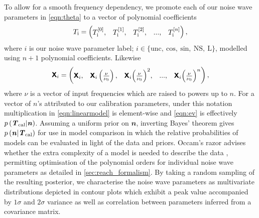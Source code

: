 To allow for a smooth frequency dependency, we promote each of our noise wave parameters in \cref{eqn:theta} to a vector of polynomial coefficients
\begin{equation}
    T_{\mathrm{i}} = \begin{pmatrix}
    T_{\mathrm{i}}^{[0]}, & T_{\mathrm{i}}^{[1]}, & T_{\mathrm{i}}^{[2]}, & ..., & T_{\mathrm{i}}^{[n]}
    \end{pmatrix},
\end{equation}
where $i$ is our noise wave parameter label; $i \in \{\mathrm{unc, \ cos, \ sin , \ NS, \ L}\}$, modelled using $n+1$ polynomial coefficients. Likewise
\begin{equation}
    \textbf{\textsf{X}}_{i} = \begin{pmatrix}
    \textbf{\textsf{X}}_{i}, & \textbf{\textsf{X}}_{i}\left(\frac{\nu}{\nu_0}\right), & \textbf{\textsf{X}}_{i}{\left(\frac{\nu}{\nu_0}\right)}^2, & ..., &  \textbf{\textsf{X}}_{i}{\left(\frac{\nu}{\nu_0}\right)}^{n}
    \end{pmatrix},
\end{equation}
where $\nu$ is a vector of input frequencies which are raised to powers up to $n$. For a vector of $n$'s attributed to our calibration parameters, under this notation multiplication in \cref{eqn:linearmodel} is element-wise and \cref{eqn:ev} is effectively $p\left(\textbf{\textit{T}}_{\mathrm{cal}}|\textbf{\textit{n}}\right)$. Assuming a uniform prior on $\mathbfit{n}$, inverting Bayes' theorem gives $p\left(\textbf{\textit{n}}|\textbf{\textit{T}}_{\mathrm{cal}}\right)$ for use in model comparison in which the relative probabilities of models can be evaluated in light of the data and priors. Occam’s razor advises whether the extra complexity of a model is needed to describe the data \citep{trotta}, permitting optimisation of the polynomial orders for individual noise wave parameters as detailed in \cref{sec:reach_formalism}. By taking a random sampling of the resulting posterior, we characterise the noise wave parameters as multivariate distributions depicted in contour plots which exhibit a peak value accompanied by $1\sigma$ and $2\sigma$ variance as well as correlation between parameters inferred from a covariance matrix.


